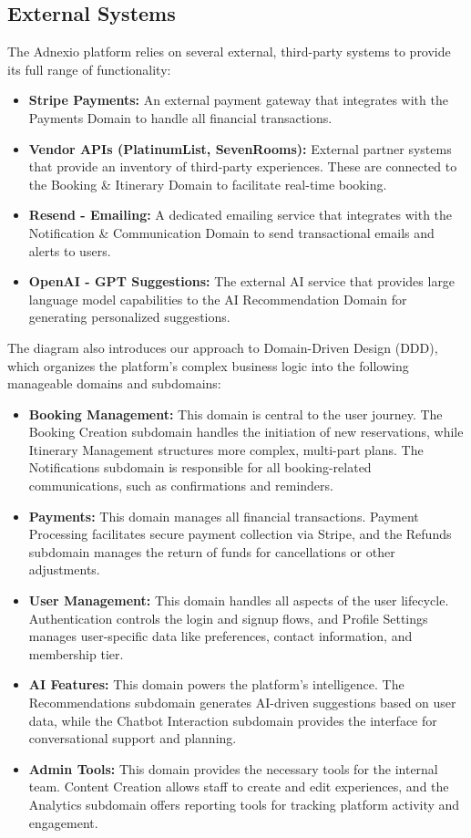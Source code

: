\subsection{External Systems}
The Adnexio platform relies on several external, third-party systems to provide its full range of functionality:
\begin{itemize}
    \item \textbf{Stripe Payments:} An external payment gateway that integrates with the Payments Domain to handle all financial transactions.
    \item \textbf{Vendor APIs (PlatinumList, SevenRooms):} External partner systems that provide an inventory of third-party experiences. These are connected to the Booking \& Itinerary Domain to facilitate real-time booking.
    \item \textbf{Resend - Emailing:} A dedicated emailing service that integrates with the Notification \& Communication Domain to send transactional emails and alerts to users.
    \item \textbf{OpenAI - GPT Suggestions:} The external AI service that provides large language model capabilities to the AI Recommendation Domain for generating personalized suggestions.
\end{itemize}
The diagram also introduces our approach to Domain-Driven Design (DDD), which organizes the platform's complex business logic into the following manageable domains and subdomains:
\begin{itemize}
    \item \textbf{Booking Management:} This domain is central to the user journey. The Booking Creation subdomain handles the initiation of new reservations, while Itinerary Management structures more complex, multi-part plans. The Notifications subdomain is responsible for all booking-related communications, such as confirmations and reminders.
    \item \textbf{Payments:} This domain manages all financial transactions. Payment Processing facilitates secure payment collection via Stripe, and the Refunds subdomain manages the return of funds for cancellations or other adjustments.
    \item \textbf{User Management:} This domain handles all aspects of the user lifecycle. Authentication controls the login and signup flows, and Profile Settings manages user-specific data like preferences, contact information, and membership tier.
    \item \textbf{AI Features:} This domain powers the platform's intelligence. The Recommendations subdomain generates AI-driven suggestions based on user data, while the Chatbot Interaction subdomain provides the interface for conversational support and planning.
    \item \textbf{Admin Tools:} This domain provides the necessary tools for the internal team. Content Creation allows staff to create and edit experiences, and the Analytics subdomain offers reporting tools for tracking platform activity and engagement.
\end{itemize}

